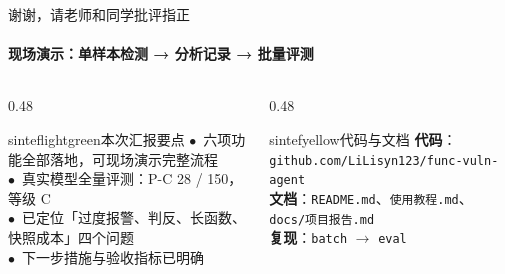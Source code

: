 \documentclass{beamer}
\newcommand{\good}{\textcolor{sintefgreen}{$\bullet$}}
\begin{document}
\begin{frame}{谢谢，请老师和同学批评指正}
\framesubtitle{现场演示：单样本检测 → 分析记录 → 批量评测}
\vspace{0.2em}
\begin{columns}[t]
\begin{column}{0.48\textwidth}
\begin{colorblock}[black]{sinteflightgreen}{本次汇报要点}
\scriptsize
\good\ 六项功能全部落地，可现场演示完整流程\\
\good\ 真实模型全量评测：P-C 28 / 150，等级 C\\
\good\ 已定位「过度报警、判反、长函数、快照成本」四个问题\\
\good\ 下一步措施与验收指标已明确
\end{colorblock}
\end{column}
\begin{column}{0.48\textwidth}
\begin{colorblock}[black]{sintefyellow}{代码与文档}
\scriptsize
\textbf{代码}：\texttt{github.com/LiLisyn123/func-vuln-agent}\\[0.2em]
\textbf{文档}：\texttt{README.md}、\texttt{使用教程.md}、\\
\quad\texttt{docs/项目报告.md}\\[0.2em]
\textbf{复现}：\texttt{batch} $\rightarrow$ \texttt{eval}
\end{colorblock}
\end{column}
\end{columns}
\end{frame}
\end{document}
